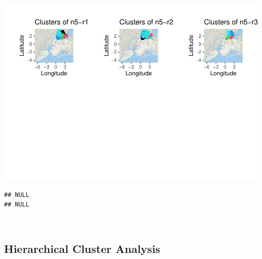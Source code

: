 \documentclass[
]{article}
\newenvironment{Shaded}{\begin{snugshade}}{\end{snugshade}}
\newcommand{\DataTypeTok}[1]{\textcolor[rgb]{0.13,0.29,0.53}{#1}}
\newcommand{\DecValTok}[1]{\textcolor[rgb]{0.00,0.00,0.81}{#1}}
\newcommand{\KeywordTok}[1]{\textcolor[rgb]{0.13,0.29,0.53}{\textbf{#1}}}
\newcommand{\NormalTok}[1]{#1}
\newcommand{\OperatorTok}[1]{\textcolor[rgb]{0.81,0.36,0.00}{\textbf{#1}}}
\begin{document}
\begin{Shaded}
\end{Shaded}

\includegraphics{project-code_files/figure-latex/unnamed-chunk-25-1.pdf}

\begin{verbatim}
## NULL
## NULL
\end{verbatim}

~\\

\hypertarget{hierarchical-cluster-analysis}{%
\subsection{Hierarchical Cluster
Analysis}\label{hierarchical-cluster-analysis}}
\end{document}
